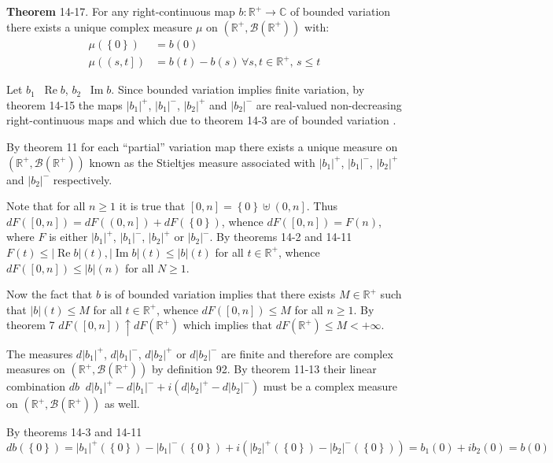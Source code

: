 \documentclass[a4paper]{article}
\newcommand{\obj}[1]{\left\{ #1 \right \}}
\newcommand{\clo}[1]{\left [ #1 \right ]}
\newcommand{\ploc}[1]{\left ( #1 \right ]}
\newcommand{\brac}[1]{\left ( #1 \right )}
\newcommand{\abs}[1]{\left | #1 \right |}
\newcommand{\Real}{\mathbb{R}}
\newcommand{\Cplx}{\mathbb{C}}
\newcommand{\borel}[1]{\mathcal{B}\brac{#1}}
\newcommand{\defn}{\mathop{\overset{\Delta}{=}}\nolimits}
\newcommand{\re}{\operatorname{Re}\nolimits}
\newcommand{\im}{\operatorname{Im}\nolimits}
\begin{document}
\label{thm:cplx_stieltjes_meas}\noindent\textbf{Theorem} 14-17.
For any right-continuous map $b:\Real^+\to\Cplx$ of bounded variation there exists a unique complex measure $\mu$ on $\brac{\Real^+,\borel{\Real^+}}$ with: \begin{align*}\mu\brac{\obj{0}}&=b\brac{0}\\\mu\brac{\ploc{s,t}}&=b\brac{t}-b\brac{s}\,\forall s,t\in\Real^+,\,s\leq t\end{align*}

Let $b_1\defn\re b$, $b_2\defn \im b$. Since bounded variation implies finite variation, by theorem 14-15 the maps $\abs{b_1}^+$, $\abs{b_1}^-$, $\abs{b_2}^+$ and $\abs{b_2}^-$ are real-valued non-decreasing right-continuous maps and which due to theorem 14-3 are of bounded variation .

By theorem 11 for each ``partial'' variation map there exists a unique measure on $\brac{\Real^+,\borel{\Real^+}}$ known as the Stieltjes measure associated with $\abs{b_1}^+$, $\abs{b_1}^-$, $\abs{b_2}^+$ and $\abs{b_2}^-$ respectively.

Note that for all $n\geq1$ it is true that $\clo{0,n}=\obj{0}\uplus\ploc{0,n}$. Thus $dF\brac{\clo{0,n}} = dF\brac{\ploc{0,n}}+dF\brac{\obj{0}}$, whence $dF\brac{\clo{0,n}} = F\brac{n}$, where $F$ is either $\abs{b_1}^+$, $\abs{b_1}^-$, $\abs{b_2}^+$ or $\abs{b_2}^-$. By theorems 14-2 and 14-11 $F\brac{t}\leq \abs{\re b}\brac{t},\abs{\im b}\brac{t}\leq \abs{b}\brac{t}$ for all $t\in\Real^+$, whence $dF\brac{\clo{0,n}}\leq \abs{b}\brac{n}$ for all $N\geq1$.

Now the fact that $b$ is of bounded variation implies that there exists $M\in \Real^+$ such that $\abs{b}\brac{t}\leq M$ for all $t\in \Real^+$, whence $dF\brac{\clo{0,n}}\leq M$ for all $n\geq1$. By theorem 7 $dF\brac{\clo{0,n}}\uparrow dF\brac{\Real^+}$ which implies that $dF\brac{\Real^+}\leq M<+\infty$.

The measures $d\abs{b_1}^+$, $d\abs{b_1}^-$, $d\abs{b_2}^+$ or $d\abs{b_2}^-$ are finite and therefore are complex measures on $\brac{\Real^+,\borel{\Real^+}}$ by definition 92. By theorem 11-13 their linear combination $db\defn d\abs{b_1}^+-d\abs{b_1}^-+i\brac{d\abs{b_2}^+-d\abs{b_2}^-}$ must be a complex measure on $\brac{\Real^+,\borel{\Real^+}}$ as well.

By theorems 14-3 and 14-11 \[db\brac{\obj{0}} = \abs{b_1}^+\brac{\obj0}-\abs{b_1}^-\brac{\obj0}+i\brac{\abs{b_2}^+\brac{\obj0}-\abs{b_2}^-\brac{\obj0}} = b_1\brac{0} + i b_2\brac{0} = b\brac{0}\]
\end{document}
